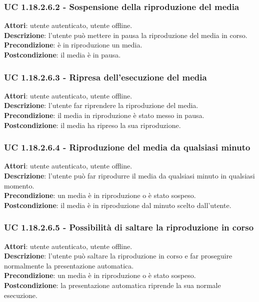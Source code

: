 	\subsubsection{UC 1.18.2.6.2 - Sospensione della riproduzione del media}{
		\label{uc1.18.2.6.2}
		\textbf{Attori}: utente autenticato, utente offline. \\
		\textbf{Descrizione}: l'utente può mettere in pausa la riproduzione del media in corso. \\
		\textbf{Precondizione}: è in riproduzione un media.	\\
		\textbf{Postcondizione}: il media è in pausa.
	}
	\subsubsection{UC 1.18.2.6.3 - Ripresa dell'esecuzione del media}{
		\label{uc1.18.2.6.3}
		\textbf{Attori}: utente autenticato, utente offline. \\
		\textbf{Descrizione}: l'utente far riprendere la riproduzione del media. \\
		\textbf{Precondizione}: il media in riproduzione è stato messo in pausa.	\\
		\textbf{Postcondizione}: il media ha ripreso la sua riproduzione.
	}
	\subsubsection{UC 1.18.2.6.4 - Riproduzione del media da qualsiasi minuto}{
		\label{uc1.18.2.6.4}
		\textbf{Attori}: utente autenticato, utente offline. \\
		\textbf{Descrizione}: l'utente può far riprodurre il media da qualsiasi minuto in qualsiasi momento. \\
		\textbf{Precondizione}: un media è in riproduzione o è stato sospeso.	\\
		\textbf{Postcondizione}: il media è in riproduzione dal minuto scelto dall'utente.
	}
	\subsubsection{UC 1.18.2.6.5 - Possibilità di saltare la riproduzione in corso}{
		\label{uc1.18.2.6.5}
		\textbf{Attori}: utente autenticato, utente offline. \\
		\textbf{Descrizione}: l'utente può saltare la riproduzione in corso e far proseguire normalmente la presentazione automatica. \\
		\textbf{Precondizione}: un media è in riproduzione o è stato sospeso.	\\
		\textbf{Postcondizione}: la presentazione automatica riprende la sua normale esecuzione.
	}

